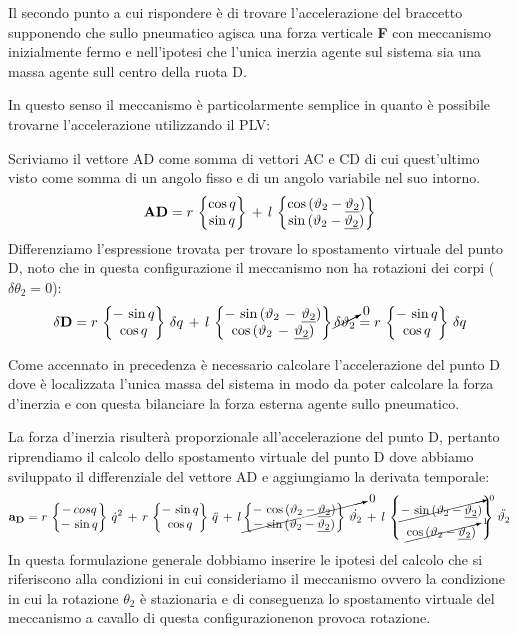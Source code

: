 Il secondo punto a cui rispondere è di trovare l'accelerazione del braccetto supponendo che sullo pneumatico agisca una forza verticale \textbf{F} con meccanismo inizialmente fermo e nell'ipotesi che l'unica inerzia agente sul sistema sia una massa agente sull centro della ruota D.

In questo senso il meccanismo è particolarmente semplice in quanto è possibile trovarne l'accelerazione utilizzando il PLV:

Scriviamo il vettore AD come somma di vettori AC e CD di cui quest'ultimo visto come somma di un angolo fisso e di un angolo variabile nel suo intorno.
\[\mathbf{AD} = r\,\begin{Bmatrix}\cos{q}\\\sin{q}\end{Bmatrix}\,+\,l\,\begin{Bmatrix}\cos{(\vartheta_2-\underline{\vartheta_2})}\\\sin{(\vartheta_2-\underline{\vartheta_2})}\end{Bmatrix}\]
Differenziamo l'espressione trovata per trovare lo spostamento virtuale del punto D, noto che in questa configurazione il meccanismo non ha rotazioni dei corpi ($\delta \theta_2 = 0$):
\[\delta\mathbf{D} = r\,\begin{Bmatrix}-\,\sin{q}\\\cos{q}\end{Bmatrix}\,\delta q\,+\,l\,\begin{Bmatrix}-\,\sin{(\vartheta_2\,-\,\underline{\vartheta_2})}\\\cos{(\vartheta_2\,-\,\underline{\vartheta_2})}\end{Bmatrix}\cancelto{0}{\delta \vartheta_2} = r\,\begin{Bmatrix}-\,\sin{q}\\\cos{q}\end{Bmatrix}\,\delta q\]

Come accennato in precedenza è necessario calcolare l'accelerazione del punto D dove è localizzata l'unica massa del sistema in modo da poter calcolare la forza d'inerzia e con questa bilanciare la forza esterna agente sullo pneumatico.

La forza d'inerzia risulterà proporzionale all'accelerazione del punto D, pertanto riprendiamo il calcolo dello spostamento virtuale del punto D dove abbiamo sviluppato il differenziale del vettore AD e aggiungiamo la derivata temporale:
\[\mathbf{a_D} = r\,\begin{Bmatrix}-\,cos{q}\\-\,\sin{q}\end{Bmatrix}\,\dot{q}^2\,+\,r\,\begin{Bmatrix}-\,\sin{q}\\\cos{q}\end{Bmatrix}\,\ddot{q}\,+\,l\,\cancelto{0}{\begin{Bmatrix}-\,\cos{(\vartheta_2-\underline{\vartheta_2})}\\-\,\sin{(\vartheta_2-\underline{\vartheta_2})}\end{Bmatrix}\,\dot{\vartheta_2}}\,+\,l\,\begin{Bmatrix}\cancelto{0}{-\,\sin{(\vartheta_2-\underline{\vartheta_2})}}\\\cancelto{1}{\cos{(\vartheta_2-\underline{\vartheta_2})}}\end{Bmatrix}\,\ddot{\vartheta_2}\]
In questa formulazione generale dobbiamo inserire le ipotesi del calcolo che si riferiscono alla condizioni in cui consideriamo il meccanismo ovvero la condizione in cui la rotazione $\theta_2$ è stazionaria e di conseguenza lo spostamento virtuale del meccanismo a cavallo di questa configurazionenon provoca rotazione.

